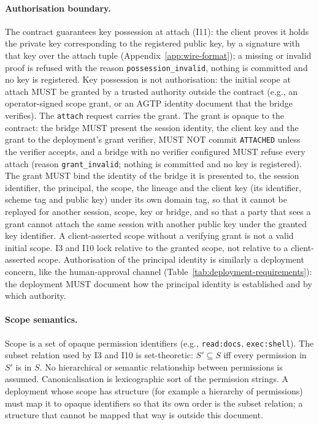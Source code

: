 \paragraph{Authorisation boundary.}
The contract guarantees key possession at attach (I11): the client
proves it holds the private key corresponding to the registered
public key, by a signature with that key over the attach tuple
(Appendix~\ref{app:wire-format}); a missing or invalid proof is refused
with the reason \texttt{possession\_invalid}, nothing is committed and no
key is registered. Key possession is not authorisation: the initial scope
at attach MUST be granted by a trusted authority outside the
contract (e.g., an operator-signed scope grant, or an AGTP identity
document that the bridge verifies). The \texttt{attach} request
carries the grant. The grant is opaque to the contract: the bridge
MUST present the session identity, the client key and the grant to the
deployment's grant verifier, MUST NOT commit \texttt{ATTACHED} unless the
verifier accepts, and a bridge with no verifier configured MUST refuse
every attach (reason \texttt{grant\_invalid}; nothing is committed and no
key is registered). The grant MUST bind the identity of the bridge it is presented
to, the session identifier, the principal, the scope, the lineage and
the client key (its identifier, scheme tag and public key) under its own
domain tag, so that it cannot be replayed for another session, scope,
key or bridge, and so that a party that sees a grant cannot attach the
same session with another public key under the granted key identifier. A client-asserted scope without a verifying grant is not a valid
initial scope. I3 and I10
lock relative to the granted scope, not relative to a
client-asserted scope. Authorisation of the principal identity is
similarly a deployment concern, like the human-approval channel
(Table~\ref{tab:deployment-requirements}): the deployment MUST
document how the principal identity is established and by which
authority.

\paragraph{Scope semantics.}
Scope is a set of opaque permission identifiers (e.g.,
\texttt{read:docs}, \texttt{exec:shell}). The subset relation used
by I3 and I10 is set-theoretic: $S' \subseteq S$ iff every
permission in $S'$ is in $S$. No hierarchical or semantic
relationship between permissions is assumed. Canonicalisation is
lexicographic sort of the permission strings. A deployment whose scope
has structure (for example a hierarchy of permissions) must map it to
opaque identifiers so that its own order is the subset relation; a
structure that cannot be mapped that way is outside this document.

